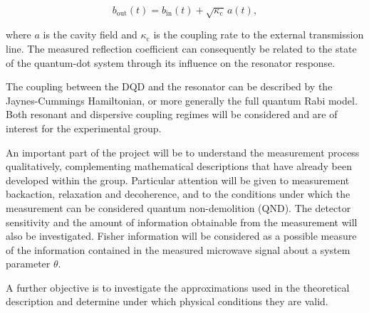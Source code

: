 $$
b_{\mathrm{out}}(t)=b_{\mathrm{in}}(t)+\sqrt{\kappa_{\mathrm{c}}}\,a(t),
$$

where \(a\) is the cavity field and \(\kappa_{\mathrm{c}}\) is the coupling rate to the external transmission line. The measured reflection coefficient can consequently be related to the state of the quantum-dot system through its influence on the resonator response.

The coupling between the DQD and the resonator can be described by the Jaynes-Cummings Hamiltonian, or more generally the full quantum Rabi model. Both resonant and dispersive coupling regimes will be considered and are of interest for the experimental group.

An important part of the project will be to understand the measurement process qualitatively, complementing mathematical descriptions that have already been developed within the group. Particular attention will be given to measurement backaction, relaxation and decoherence, and to the conditions under which the measurement can be considered quantum non-demolition (QND). The detector sensitivity and the amount of information obtainable from the measurement will also be investigated. Fisher information will be considered as a possible measure of the information contained in the measured microwave signal about a system parameter $\theta$.


A further objective is to investigate the approximations used in the theoretical description and determine under which physical conditions they are valid. 